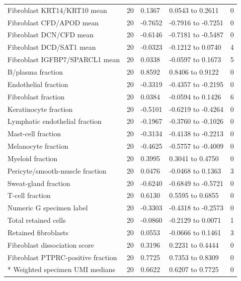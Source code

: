 \documentclass[10pt,a4paper]{article}
\begin{document}
{{\begin{longtable}{@{}p{67mm}p{18mm}p{23mm}p{37mm}p{20mm}@{}}
Fibroblast KRT14/KRT10 mean & 20 & 0.1367 & 0.0543 to 0.2611 & 0 \\
Fibroblast CFD/APOD mean & 20 & -0.7652 & -0.7916 to -0.7251 & 0 \\
Fibroblast DCN/CFD mean & 20 & -0.6146 & -0.7181 to -0.5487 & 0 \\
Fibroblast DCD/SAT1 mean & 20 & -0.0323 & -0.1212 to 0.0740 & 4 \\
Fibroblast IGFBP7/SPARCL1 mean & 20 & 0.0338 & -0.0597 to 0.1673 & 5 \\
B/plasma fraction & 20 & 0.8592 & 0.8406 to 0.9122 & 0 \\
Endothelial fraction & 20 & -0.3319 & -0.4357 to -0.2195 & 0 \\
Fibroblast fraction & 20 & 0.0384 & -0.0594 to 0.1426 & 6 \\
Keratinocyte fraction & 20 & -0.5101 & -0.6219 to -0.4264 & 0 \\
Lymphatic endothelial fraction & 20 & -0.1967 & -0.3760 to -0.1026 & 0 \\
Mast-cell fraction & 20 & -0.3134 & -0.4138 to -0.2213 & 0 \\
Melanocyte fraction & 20 & -0.4625 & -0.5757 to -0.4009 & 0 \\
Myeloid fraction & 20 & 0.3995 & 0.3041 to 0.4750 & 0 \\
Pericyte/smooth-muscle fraction & 20 & 0.0476 & -0.0468 to 0.1363 & 3 \\
Sweat-gland fraction & 20 & -0.6240 & -0.6849 to -0.5721 & 0 \\
T-cell fraction & 20 & 0.6130 & 0.5595 to 0.6855 & 0 \\
Numeric G specimen label & 20 & -0.3303 & -0.4318 to -0.2573 & 0 \\
Total retained cells & 20 & -0.0860 & -0.2129 to 0.0071 & 1 \\
Retained fibroblasts & 20 & 0.0553 & -0.0666 to 0.1461 & 3 \\
Fibroblast dissociation score & 20 & 0.3196 & 0.2231 to 0.4444 & 0 \\
Fibroblast PTPRC-positive fraction & 20 & 0.7725 & 0.7353 to 0.8309 & 0 \\*
Weighted specimen UMI medians & 20 & 0.6622 & 0.6207 to 0.7725 & 0 \\
\end{longtable}
}

}
\end{document}
